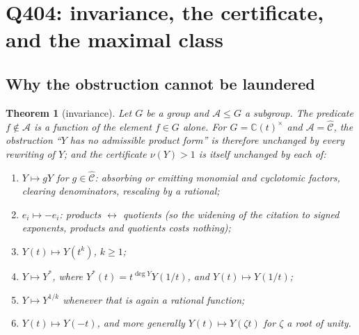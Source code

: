 \documentclass[11pt]{article}
\newtheorem{theorem}{Theorem}[section]
\theoremstyle{definition}
\newcommand{\CC}{\mathbb{C}}
\newcommand{\Chat}{\widehat{\mathcal{C}}}
\begin{document}
\section{Q404: invariance, the certificate, and the maximal class}\label{sec:invariance}

\subsection{Why the obstruction cannot be laundered}

\begin{theorem}[invariance]\label{thm:invariance}
Let $G$ be a group and $\mathcal{A}\le G$ a subgroup. The predicate $f\notin\mathcal{A}$ is a
function of the element $f\in G$ alone. For $G=\CC(t)^\times$ and $\mathcal{A}=\Chat$, the
obstruction ``$Y$ has no admissible product form'' is therefore unchanged by every rewriting of
$Y$; and the certificate $\nu(Y)>1$ is itself unchanged by each of:
\begin{enumerate}
\item[(R1)] $Y\mapsto gY$ for $g\in\Chat$: absorbing or emitting monomial and cyclotomic factors,
clearing denominators, rescaling by a rational;
\item[(R2)] $e_i\mapsto-e_i$: products $\leftrightarrow$ quotients (so the widening of the citation
to signed exponents, products and quotients costs nothing);
\item[(R3)] $Y(t)\mapsto Y(t^{k})$, $k\ge1$;
\item[(R4)] $Y\mapsto Y^{*}$, where $Y^*(t)=t^{\deg Y}Y(1/t)$, and $Y(t)\mapsto Y(1/t)$;
\item[(R5)] $Y\mapsto Y^{1/k}$ whenever that is again a rational function;
\item[(R6)] $Y(t)\mapsto Y(-t)$, and more generally $Y(t)\mapsto Y(\zeta t)$ for $\zeta$ a root
of unity.
\end{enumerate}
\end{theorem}
\end{document}
